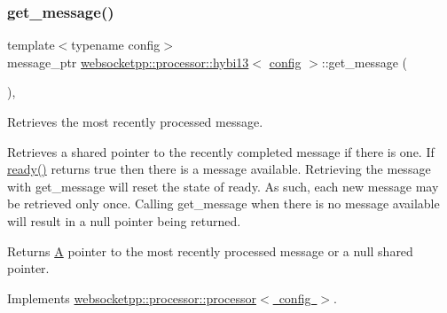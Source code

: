 \subsubsection{\texorpdfstring{get\+\_\+message()}{get\_message()}}
{\footnotesize\ttfamily template$<$typename config$>$ \\
message\+\_\+ptr \mbox{\hyperlink{classwebsocketpp_1_1processor_1_1hybi13}{websocketpp\+::processor\+::hybi13}}$<$ \mbox{\hyperlink{classconfig}{config}} $>$\+::get\+\_\+message (\begin{DoxyParamCaption}{ }\end{DoxyParamCaption})\hspace{0.3cm}{\ttfamily [inline]}, {\ttfamily [virtual]}}



Retrieves the most recently processed message. 

Retrieves a shared pointer to the recently completed message if there is one. If \mbox{\hyperlink{classwebsocketpp_1_1processor_1_1hybi13_af0e73b14cac728a873c8b5c0bc82ed03}{ready()}} returns true then there is a message available. Retrieving the message with get\+\_\+message will reset the state of ready. As such, each new message may be retrieved only once. Calling get\+\_\+message when there is no message available will result in a null pointer being returned.

\begin{DoxyReturn}{Returns}
\mbox{\hyperlink{struct_a}{A}} pointer to the most recently processed message or a null shared pointer. 
\end{DoxyReturn}


Implements \mbox{\hyperlink{classwebsocketpp_1_1processor_1_1processor_afb9477aa9e49a7dca59d684277b66932}{websocketpp\+::processor\+::processor$<$ config $>$}}.

\mbox{\label{classwebsocketpp_1_1processor_1_1hybi13_a888318b2773af49d458313a96a817a7a}} 
